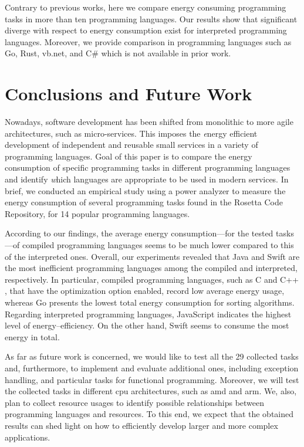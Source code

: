 Contrary to previous works, here we compare energy consuming 
programming tasks in more than ten programming languages.
Our results show that significant diverge with respect to 
energy consumption exist for interpreted programming languages. 
Moreover, we provide comparison in programming languages such 
as Go, Rust, {\sc vb.net}, and C\# which is not available in 
prior work.


\section{Conclusions and Future Work} \label{conclusiona_and_future_work}
Nowadays, software development has been shifted from
monolithic to more agile architectures, such as micro-services.
This imposes the {\emph energy efficient} development of independent and reusable
small services in a variety of programming languages.
Goal of this paper is to compare the energy consumption
of specific programming tasks in different programming languages
and identify {\emph which} languages are appropriate to be used in modern services.
In brief, we conducted an empirical study
using a power analyzer to measure the energy consumption
of several programming tasks found in the Rosetta Code Repository,
for 14 popular programming languages.

According to our findings,
the average energy consumption---for the tested tasks---of compiled programming languages
seems to be much lower compared to this of the interpreted ones.
Overall, our experiments revealed that Java and Swift are the most inefficient 
programming languages among the compiled and interpreted, respectively.
In particular, compiled programming languages, such as C and C++ ,
that have the optimization  option enabled,
record low average energy usage,
whereas Go presents the lowest total energy consumption
for sorting algorithms. 
Regarding interpreted programming languages,
JavaScript indicates the highest level of energy--efficiency.
On the other hand, Swift seems to consume the most energy in total.

As far as future work is concerned,
we would like to test all the 29 collected 
tasks and, furthermore, to implement and evaluate additional ones,
including exception handling,
and particular tasks for functional programming. 
Moreover, we will test the collected tasks in different {\sc cpu} 
architectures, such as {\sc amd} and {\sc arm}. 
We, also, plan to collect resource usages to identify 
possible relationships between programming  languages and resources. 
To this end, we expect that the obtained results can shed light
on how to efficiently develop larger and more complex applications.
